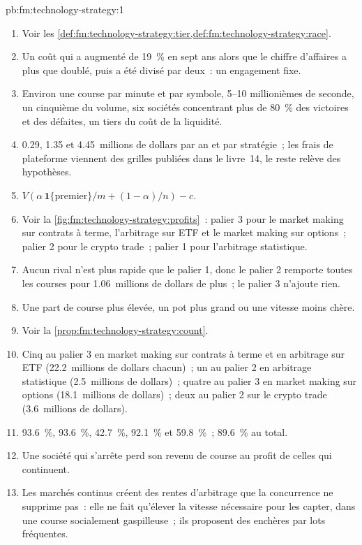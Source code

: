 \begin{solution}{pb:fm:technology-strategy:1}
\begin{enumerate}
\item Voir les \cref{def:fm:technology-strategy:tier,def:fm:technology-strategy:race}.
\item Un coût qui a augmenté de 19~\% en sept ans alors que le chiffre d'affaires a plus que doublé, puis a été divisé par deux~: un engagement fixe.
\item Environ une course par minute et par symbole, 5--10 millionièmes de seconde, un cinquième du volume, six sociétés concentrant plus de 80~\% des victoires et des défaites, un tiers du
coût de la liquidité.
\item 0.29, 1.35 et 4.45~millions de dollars par an et par stratégie~; les frais de plateforme viennent des grilles publiées dans le livre~14, le reste relève des hypothèses.
\item $V(\alpha\,\mathbf 1\{\text{premier}\}/m+(1-\alpha)/n)-c$.
\item Voir la \cref{fig:fm:technology-strategy:profits}~: palier 3 pour le market making sur contrats à terme, l'arbitrage sur ETF et le market making sur options~; palier 2 pour le
crypto trade~; palier 1 pour l'arbitrage statistique.
\item Aucun rival n'est plus rapide que le palier 1, donc le palier 2 remporte toutes les courses pour 1.06~millions de dollars de plus~; le palier 3 n'ajoute rien.
\item Une part de course plus élevée, un pot plus grand ou une vitesse moins chère.
\item Voir la \cref{prop:fm:technology-strategy:count}.
\item Cinq au palier 3 en market making sur contrats à terme et en arbitrage sur ETF (22.2~millions de dollars chacun)~; un au palier 2 en arbitrage statistique (2.5~millions de dollars)~; quatre au
palier 3 en market making sur options (18.1~millions de dollars)~; deux au palier 2 sur le crypto trade (3.6~millions de dollars).
\item 93.6~\%, 93.6~\%, 42.7~\%, 92.1~\% et 59.8~\%~; 89.6~\% au total.
\item Une société qui s'arrête perd son revenu de course au profit de celles qui continuent.
\item Les marchés continus créent des rentes d'arbitrage que la concurrence ne supprime pas~: elle ne fait qu'élever la vitesse nécessaire pour les capter, dans une course socialement
gaspilleuse~; ils proposent des enchères par lots fréquentes.

\end{enumerate}
\end{solution}
